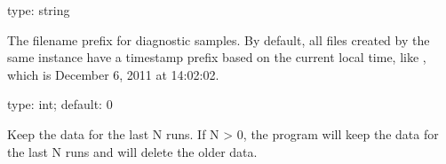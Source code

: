 \documentclass[letterpaper,10pt,english]{sphinxmanual}
\begin{document}
\begin{fulllineitems}
\label{\detokenize{mariadb-stat:cmdoption-mariadb-stat-prefix}}
\sphinxAtStartPar
type: string

\sphinxAtStartPar
The filename prefix for diagnostic samples.  By default, all files created
by the same {\hyperref[\detokenize{mariadb-stat:cmdoption-mariadb-stat-collect}]{}} instance have a timestamp prefix based on the current
local time, like , which is December 6, 2011 at 14:02:02.

\end{fulllineitems}


\begin{fulllineitems}
\label{\detokenize{mariadb-stat:cmdoption-mariadb-stat-retention-count}}
\sphinxAtStartPar
type: int; default: 0

\sphinxAtStartPar
Keep the data for the last N runs. If N \textgreater{} 0, the program will keep the data for the last
N runs and will delete the older data.

\end{fulllineitems}

\end{document}
